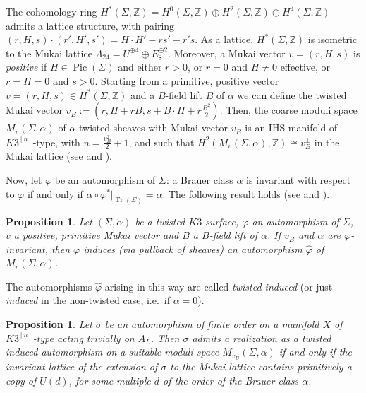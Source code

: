 \documentclass{amsart}
\newtheorem{prop}[theorem]{Proposition}
\theoremstyle{definition}
\newcommand{\IZ}{\mathbb{Z}}
\newcommand{\coloneqq}{:=}
\newcommand{\hskn}{K3^{\left[n\right]}}
\DeclareMathOperator{\pic}{Pic}
\DeclareMathOperator{\trans}{Tr}
\begin{document}
The cohomology ring $H^*(\Sigma, \IZ) = H^0(\Sigma, \IZ) \oplus H^2(\Sigma, \IZ) \oplus H^4(\Sigma, \IZ)$ admits a lattice structure, with pairing $(r,H,s)\cdot (r',H',s') = H\cdot H' - rs' -r's$. As a lattice, $H^*(\Sigma, \IZ)$ is isometric to the Mukai lattice $\Lambda_{24} = U^{\oplus 4} \oplus E_8^{\oplus 2}$. Moreover, a Mukai vector $v = (r,H,s)$ is \emph{positive} if $H \in \pic(\Sigma)$ and either $r > 0$, or $r = 0$ and $H \neq 0$ effective, or $r = H = 0$ and $s > 0$. Starting from a primitive, positive vector $v=(r,H,s) \in H^*(\Sigma, \IZ)$ and a $B$-field lift $B$ of $\alpha$ we can define the twisted Mukai vector $v_B \coloneqq (r, H + rB, s + B \cdot H + r\frac{B^2}{2})$. Then, the coarse moduli space $M_{v}(\Sigma, \alpha)$ of $\alpha$-twisted sheaves with Mukai vector $v_B$ is an IHS manifold of $\hskn$-type, with $n = \frac{v_B^2}{2} + 1$, and such that $H^2(M_{v}(\Sigma, \alpha), \IZ) \cong v_{B}^\perp$ in the Mukai lattice (see \cite{baymacr} and \cite{yoshioka_twisted}).

Now, let $\varphi$ be an automorphism of $\Sigma$: a Brauer class $\alpha$ is invariant with respect to $\varphi$ if and only if $\alpha \circ \varphi^*\vert_{\trans(\Sigma)} = \alpha$. The following result holds (see \cite[Proposition 1.32]{mw} and \cite[\S 3]{ckkm}).

\begin{prop} \label{induced autom}
Let $(\Sigma, \alpha)$ be a twisted $K3$ surface, $\varphi$ an automorphism of $\Sigma$, $v$ a positive, primitive Mukai vector and $B$ a $B$-field lift of $\alpha$. If $v_B$ and $\alpha$ are $\varphi$-invariant, then $\varphi$ induces (via pullback of sheaves) an automorphism $\hat{\varphi}$ of $M_{v}(\Sigma, \alpha)$.
\end{prop} 

The automorphisms $\hat{\varphi}$ arising in this way are called \textit{twisted induced} (or just \textit{induced} in the non-twisted case, i.e.\ if $\alpha = 0$). 

\begin{prop} \cite[Theorem 3.4]{ckkm}
Let $\sigma$ be an automorphism of finite order on a manifold $X$ of $\hskn$-type acting trivially on $A_L$. Then $\sigma$ admits a realization as a twisted induced automorphism on a suitable moduli space $M_{v_B}(\Sigma, \alpha)$ if and only if the invariant lattice of the extension of $\sigma$ to the Mukai lattice contains primitively a copy of $U(d)$, for some multiple $d$ of the order of the Brauer class $\alpha$. 
\end{prop}
\end{document}
